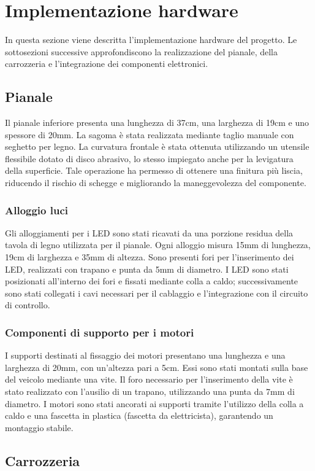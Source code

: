 \documentclass{article}
\begin{document}
\section{Implementazione hardware}
In questa sezione viene descritta l’implementazione hardware del progetto. Le sottosezioni successive approfondiscono la realizzazione del pianale, della carrozzeria e l’integrazione dei componenti elettronici.
\subsection{Pianale}
Il pianale inferiore presenta una lunghezza di 37cm, una larghezza di 19cm e uno spessore di 20mm. La sagoma è stata realizzata mediante taglio manuale con seghetto per legno. La curvatura frontale è stata ottenuta utilizzando un utensile flessibile dotato di disco abrasivo, lo stesso impiegato anche per la levigatura della superficie. Tale operazione ha permesso di ottenere una finitura più liscia, riducendo il rischio di schegge e migliorando la maneggevolezza del componente.
\subsubsection{Alloggio luci}
Gli alloggiamenti per i LED sono stati ricavati da una porzione residua della tavola di legno utilizzata per il pianale. Ogni alloggio misura 15mm di lunghezza, 19cm di larghezza e 35mm di altezza. Sono presenti fori per l’inserimento dei LED, realizzati con trapano e punta da 5mm di diametro. I LED sono stati posizionati all’interno dei fori e fissati mediante colla a caldo; successivamente sono stati collegati i cavi necessari per il cablaggio e l’integrazione con il circuito di controllo.
\subsubsection{Componenti di supporto per i motori}
I supporti destinati al fissaggio dei motori presentano una lunghezza e una larghezza di 20mm, con un’altezza pari a 5cm. Essi sono stati montati sulla base del veicolo mediante una vite. Il foro necessario per l'inserimento della vite è stato realizzato con l’ausilio di un trapano, utilizzando una punta da 7mm di diametro.
\newline
I motori sono stati ancorati ai supporti tramite l’utilizzo della colla a caldo e una fascetta in plastica (fascetta da elettricista), garantendo un montaggio stabile.
\subsection{Carrozzeria}
\end{document}
